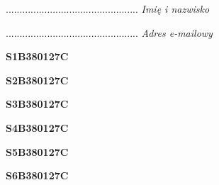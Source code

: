 \begin{turn}{90}\begin{minipage}{\linewidth} \vspace{20mm} ................................................  \textit{Imię i nazwisko}\end{minipage}\end{turn}

\begin{turn}{90}\begin{minipage}{\linewidth} \vspace{20mm} ................................................  \textit{Adres e-mailowy}\end{minipage}\end{turn}

\begin{turn}{90}\huge \begin{minipage}{\linewidth} \vspace{10mm}\textbf{S1B380127C}\end{minipage}\end{turn}

\begin{turn}{90}\huge \begin{minipage}{\linewidth} \vspace{10mm}\textbf{S2B380127C}\end{minipage}\end{turn}

\begin{turn}{90}\huge \begin{minipage}{\linewidth} \vspace{10mm}\textbf{S3B380127C}\end{minipage}\end{turn}

\begin{turn}{90}\huge \begin{minipage}{\linewidth} \vspace{10mm}\textbf{S4B380127C}\end{minipage}\end{turn}

\begin{turn}{90}\huge \begin{minipage}{\linewidth} \vspace{10mm}\textbf{S5B380127C}\end{minipage}\end{turn}

\begin{turn}{90}\huge \begin{minipage}{\linewidth} \vspace{10mm}\textbf{S6B380127C}\end{minipage}\end{turn}

